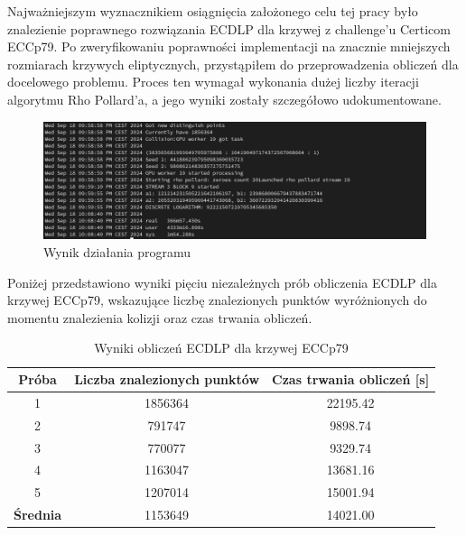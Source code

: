 Najważniejszym wyznacznikiem osiągnięcia założonego celu tej pracy było
znalezienie poprawnego rozwiązania ECDLP dla krzywej z challenge'u Certicom ECCp79.
Po zweryfikowaniu poprawności implementacji na znacznie mniejszych rozmiarach
krzywych eliptycznych, przystąpiłem do przeprowadzenia obliczeń dla docelowego
problemu. Proces ten wymagał wykonania dużej liczby iteracji algorytmu Rho Pollard'a,
a jego wyniki zostały szczegółowo udokumentowane.
\begin{figure}[H]
    \centering
    \includegraphics[width=1\textwidth]{img/first_attempt.png}
    \caption{Wynik działania programu}
    \label{fig:first_attempt}
\end{figure}

Poniżej przedstawiono wyniki pięciu niezależnych prób obliczenia ECDLP dla
krzywej ECCp79, wskazujące liczbę znalezionych punktów wyróżnionych do momentu
znalezienia kolizji oraz czas trwania obliczeń.
\begin{table}[H]
    \centering
    \caption{Wyniki obliczeń ECDLP dla krzywej ECCp79}
    \label{tab:eccp79_results}
    \begin{tabular}{|c|c|c|}
        \hline
        \textbf{Próba}   & \textbf{Liczba znalezionych punktów} &
        \textbf{Czas trwania obliczeń [s]}                                      \\ \hline
        1                & 1856364                             & 22195.42      \\ \hline
        2                & 791747                              & 9898.74       \\ \hline
        3                & 770077                              & 9329.74       \\ \hline
        4                & 1163047                             & 13681.16      \\ \hline
        5                & 1207014                             & 15001.94      \\ \hline
        \textbf{Średnia} & 1153649                             & 14021.00      \\ \hline
    \end{tabular}
\end{table}




